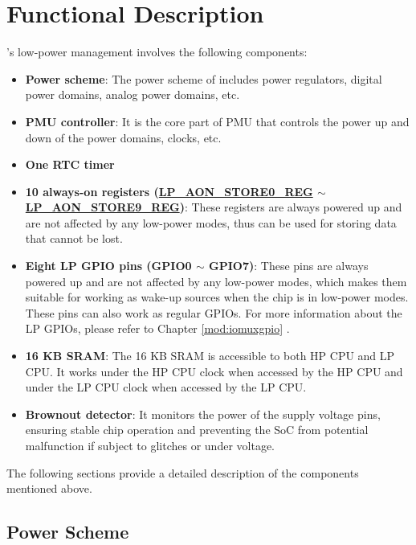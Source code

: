 \documentclass[main\_\_EN.tex]{subfiles}
\begin{document}
\section{Functional Description}

\chipname{}'s low-power management involves the following components:

\begin{itemize}
    \item \textbf{Power scheme}: The power scheme of \chipname{} includes power regulators, digital power domains, analog power domains, etc.

    \item \textbf{PMU controller}: It is the core part of PMU that controls the power up and down of the power domains, clocks, etc.

    \item \textbf{One RTC timer}

    \item \textbf{10 always-on registers (\hyperref[regdesc:LPAONSTORENREG]{LP\_AON\_STORE0\_REG} $\sim$ \hyperref[regdesc:LPAONSTORENREG]{LP\_AON\_STORE9\_REG})}: These registers are always powered up and are not affected by any low-power modes, thus can be used for storing data that cannot be lost.

    \item \textbf{Eight LP GPIO pins (GPIO0 $\sim$ GPIO7)}: These pins are always powered up and are not affected by any low-power modes, which makes them suitable for working as wake-up sources when the chip is in low-power modes. These pins can also work as regular GPIOs. For more information about the LP GPIOs, please refer to Chapter \ref{mod:iomuxgpio} \textit{}.

    \item \textbf{16 KB SRAM}: The 16 KB SRAM is accessible to both HP CPU and LP CPU. It works under the HP CPU clock when accessed by the HP CPU and under the LP CPU clock when accessed by the LP CPU.

    \item \textbf{Brownout detector}: It monitors the power of the supply voltage pins, ensuring stable chip operation and preventing the SoC from potential malfunction if subject to glitches or under voltage.
\end{itemize}

The following sections provide a detailed description of the components mentioned above.

\subsection{Power Scheme}
\end{document}
